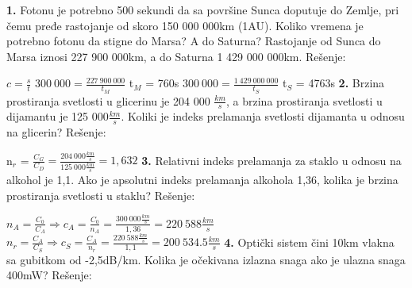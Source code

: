 \documentclass{article}
\begin{document}
\vspace{0.6cm}\newline
\textbf{1.} Fotonu je potrebno 500 sekundi da sa površine Sunca doputuje do Zemlje, pri čemu pređe rastojanje od skoro 150 000 000km (1AU). Koliko vremena je potrebno fotonu da stigne do Marsa? A do Saturna? Rastojanje od Sunca do Marsa iznosi 227 900 000km, a do Saturna 1 429 000 000km. 
\vspace*{0.4cm}\newline
Rešenje: \newline

$c = \frac{s}{t}$
\vspace{0.2cm} \newline
\hspace*{0.4cm}$300\ 000 = \frac{227\ 900\ 000}{t_M}$ \Rightarrow t$_M$ = 760s
\vspace{0.2cm} \newline
\hspace*{0.4cm}$300\ 000 = \frac{1\ 429\ 000\ 000}{t_S}$ \Rightarrow t$_S$ = 4763s
\vspace*{0.4cm}\newline
\textbf{2.} Brzina prostiranja svetlosti u glicerinu je 204 000 $\frac{km}{s}$, a brzina prostiranja svetlosti u dijamantu je 125 000$\frac{km}{s}$. Koliki je indeks prelamanja svetlosti dijamanta u odnosu na glicerin?
\vspace*{0.4cm}\newline
Rešenje: \newline

n$_r$ = $\frac{C_G}{C_D} = \frac{204\ 000\frac{km}{s}}{125\ 000\frac{km}{s}} = 1,632$ 
\vspace{3cm}\newline
\textbf{3.} Relativni indeks prelamanja za staklo u odnosu na alkohol je 1,1. Ako je apsolutni indeks prelamanja alkohola 1,36, kolika je brzina prostiranja svetlosti u staklu? 
\vspace*{0.4cm}\newline
Rešenje: \newline

$n_A = \frac{C_0}{C_A} \Rightarrow c_A = \frac{C_0}{n_A} = \frac{300\ 000\frac{km}{s}}{1,36} = 220\ 588\frac{km}{s}$
\vspace{0.2cm} \newline
\hspace*{0.5cm}$n_r = \frac{C_A}{C_S} \Rightarrow c_S = \frac{C_A}{n_r} = \frac{220\ 588\frac{km}{s}}{1,1} = 200\ 534.5\frac{km}{s}$
\vspace*{0.4cm}\newline
\textbf{4.} Optički sistem čini 10km vlakna sa gubitkom od -2,5dB/km. Kolika je očekivana izlazna snaga ako je
ulazna snaga 400mW? 
\vspace*{0.4cm}\newline
Rešenje: \newline
\end{document}

